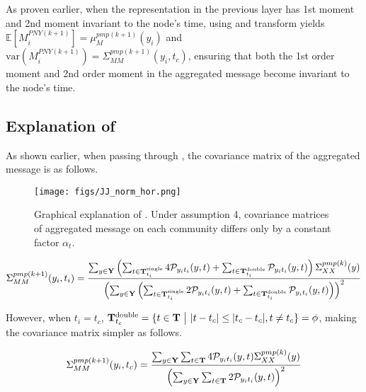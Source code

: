 As proven earlier, when the representation in the previous layer has 1st moment and 2nd moment invariant to the node's time, using \PMP and \PNY transform yields $\mathbb{E}[M_i^{PNY(k+1)}]=\mu_{M}^{pmp(k+1)}(y_i)$ and $\text{var}(M_i^{PNY(k+1)})=\Sigma^{pmp(k+1)}_{MM}(y_i,t_{c})$, ensuring that both the 1st order moment and 2nd order moment in the aggregated message become invariant to the node's time.













\subsection{Explanation of \JJnorm}
\label{apdx:JJnorm}
As shown earlier, when passing through \PMP, the covariance matrix of the aggregated message is as follows.
\begin{figure}[hbt!]
	\centering
	\texttt{[image: figs/JJ\_norm\_hor.png]}
	\vspace{-0.1in}
	\caption{Graphical explanation of \JJnorm. Under assumption 4, covariance matrices of aggregated message on each community differs only by a constant factor $\alpha_t$.}
	 \label{fig:JJ}
\end{figure}

\begin{align}
\Sigma^{pmp(k+1)}_{MM}(y_i,t_i) = {\sum_{y\in \bold{Y}}\left(\sum_{t\in\bold{T}_{t_i}^{\text{single}}}4\mathcal{P}_{y_i t_i}(y, t)+\sum_{t\in\bold{T}_{t_i}^{\text{double}}}\mathcal{P}_{y_i t_i}(y, t)\right)\Sigma^{pmp(k)}_{XX}(y)
\over
\left(\sum_{y\in \bold{Y}}\left(\sum_{t\in\bold{T}_{t_i}^{\text{single}}}2\mathcal{P}_{y_i t_i}(y, t)+\sum_{t\in\bold{T}_{t_i}^{\text{double}}}\mathcal{P}_{y_i t_i}(y, t)\right)\right)^2}
\end{align}

However, when $t_i=t_{c}$, $\bold{T}_{t_{c}}^{\text{double}}= \{t \in \bold{T}\ \big | \ |t- t_{c}|\le|t_{c}-t_{c}|, t\neq t_{c}\}=\phi$, making the covariance matrix simpler as follows.

\begin{align}
\Sigma^{pmp(k+1)}_{MM}(y_i,t_{c})= {\sum_{y\in \bold{Y}}\sum_{t\in\bold{T}}4\mathcal{P}_{y_i t_i}(y, t)\Sigma_{XX}^{pmp(k)}(y)
\over
\left(\sum_{y\in \bold{Y}}\sum_{t\in\bold{T}}2\mathcal{P}_{y_i t_i}(y, t)\right)^2}
\end{align}

